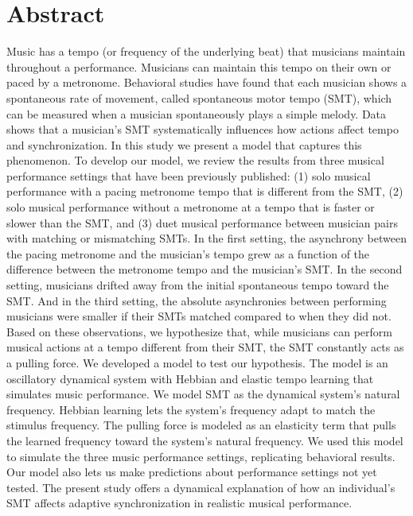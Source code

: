 \documentclass{report}
\begin{document}
\section{Abstract}
Music has a tempo (or frequency of the underlying beat) that musicians maintain throughout a performance. Musicians can maintain this tempo on their own or paced by a metronome. Behavioral studies have found that each musician shows a spontaneous rate of movement, called spontaneous motor tempo (SMT), which can be measured when a musician spontaneously plays a simple melody. Data shows that a musician's SMT systematically influences how actions affect tempo and synchronization. In this study we present a model that captures this phenomenon. To develop our model, we review the results from three musical performance settings that have been previously published: (1) solo musical performance with a pacing metronome tempo that is different from the SMT, (2) solo musical performance without a metronome at a tempo that is faster or slower than the SMT, and (3) duet musical performance between musician pairs with matching or mismatching SMTs. In the first setting, the asynchrony between the pacing metronome and the musician's tempo grew as a function of the difference between the metronome tempo and the musician's SMT. In the second setting, musicians drifted away from the initial spontaneous tempo toward the SMT. And in the third setting, the absolute asynchronies between performing musicians were smaller if their SMTs matched compared to when they did not. Based on these observations, we hypothesize that, while musicians can perform musical actions at a tempo different from their SMT, the SMT constantly acts as a pulling force. We developed a model to test our hypothesis. The model is an oscillatory dynamical system with Hebbian and elastic tempo learning that simulates music performance. We model SMT as the dynamical system's natural frequency. Hebbian learning lets the system's frequency adapt to match the stimulus frequency. The pulling force is modeled as an elasticity term that pulls the learned frequency toward the system's natural frequency. We used this model to simulate the three music performance settings, replicating behavioral results. Our model also lets us make predictions about performance settings not yet tested. The present study offers a dynamical explanation of how an individual's SMT affects adaptive synchronization in realistic musical performance.
\end{document}
